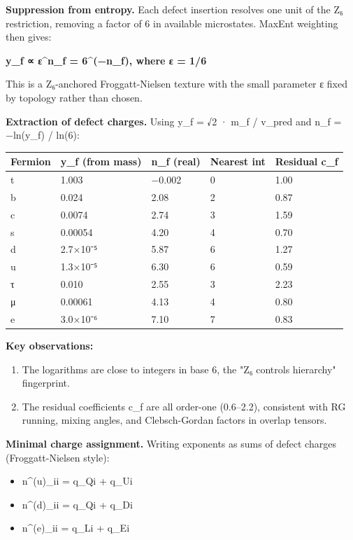 \textbf{Suppression from entropy.} Each defect insertion resolves one unit of the Z₆ restriction, removing a factor of 6 in available microstates. MaxEnt weighting then gives:

\textbf{y\_f ∝ ε\^{}n\_f = 6\^{}(−n\_f), where ε = 1/6}

This is a Z₆-anchored Froggatt-Nielsen texture with the small parameter ε fixed by topology rather than chosen.

\textbf{Extraction of defect charges.} Using y\_f = √2 · m\_f / v\_pred and n\_f = −ln(y\_f) / ln(6):

{\def\LTcaptype{none} %
\begin{longtable}[]{@{}lllll@{}}
\toprule\noalign{}
Fermion & y\_f (from mass) & n\_f (real) & Nearest int & Residual c\_f \\
\midrule\noalign{}
\endhead
\bottomrule\noalign{}
\endlastfoot
t & 1.003 & −0.002 & 0 & 1.00 \\
b & 0.024 & 2.08 & 2 & 0.87 \\
c & 0.0074 & 2.74 & 3 & 1.59 \\
s & 0.00054 & 4.20 & 4 & 0.70 \\
d & 2.7×10⁻⁵ & 5.87 & 6 & 1.27 \\
u & 1.3×10⁻⁵ & 6.30 & 6 & 0.59 \\
τ & 0.010 & 2.55 & 3 & 2.23 \\
μ & 0.00061 & 4.13 & 4 & 0.80 \\
e & 3.0×10⁻⁶ & 7.10 & 7 & 0.83 \\
\end{longtable}
}

\textbf{Key observations:}

\begin{enumerate}
\def\labelenumi{\arabic{enumi}.}
\tightlist
\item
  The logarithms are close to integers in base 6, the "Z₆ controls hierarchy" fingerprint.
\item
  The residual coefficients c\_f are all order-one (0.6--2.2), consistent with RG running, mixing angles, and Clebsch-Gordan factors in overlap tensors.
\end{enumerate}

\textbf{Minimal charge assignment.} Writing exponents as sums of defect charges (Froggatt-Nielsen style):

\begin{itemize}
\tightlist
\item
  n\^{}(u)\_ii = q\_Qi + q\_Ui
\item
  n\^{}(d)\_ii = q\_Qi + q\_Di
\item
  n\^{}(e)\_ii = q\_Li + q\_Ei
\end{itemize}

